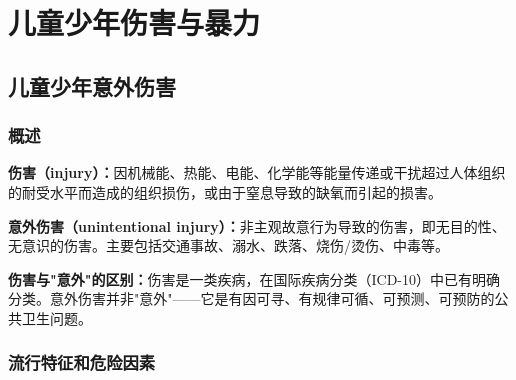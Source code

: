 \chapter{儿童少年伤害与暴力}
\setcounter{chapter}{11}

\section{儿童少年意外伤害}

\subsection{概述}

\begin{defbox}
\textbf{伤害（injury）：}因机械能、热能、电能、化学能等能量传递或干扰超过人体组织的耐受水平而造成的组织损伤，或由于窒息导致的缺氧而引起的损害。

\textbf{意外伤害（unintentional injury）：}非主观故意行为导致的伤害，即无目的性、无意识的伤害。主要包括交通事故、溺水、跌落、烧伤/烫伤、中毒等。

\textbf{伤害与"意外"的区别：}伤害是一类疾病，在国际疾病分类（ICD-10）中已有明确分类。意外伤害并非"意外"——它是有因可寻、有规律可循、可预测、可预防的公共卫生问题。
\end{defbox}

\subsection{流行特征和危险因素}

